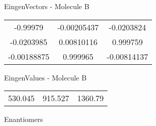 \begin{multicols}{2}
\begin{center}
\vtab
 EingenVectors - Molecule B     \\
\vtab
\begin{tabular}{|c c c|}
-0.99979	 & 	-0.00205437	 & 	-0.0203824	 \\
-0.0203985	 & 	0.00810116	 & 	0.999759	 \\
-0.00188875	 & 	0.999965	 & 	-0.00814137
\end{tabular}

\vtab
 EingenValues - Molecule B     \\
\vtab
\begin{tabular}{|c c c|}
530.045	 & 	915.527	 & 	1360.79	 \\
\end{tabular}

\end{center}
\end{multicols}
\begin{center}
\vtab
\vtab
\textcolor{NavyBlue}{\Large Enantiomers}
\end{center}

 \newpage

